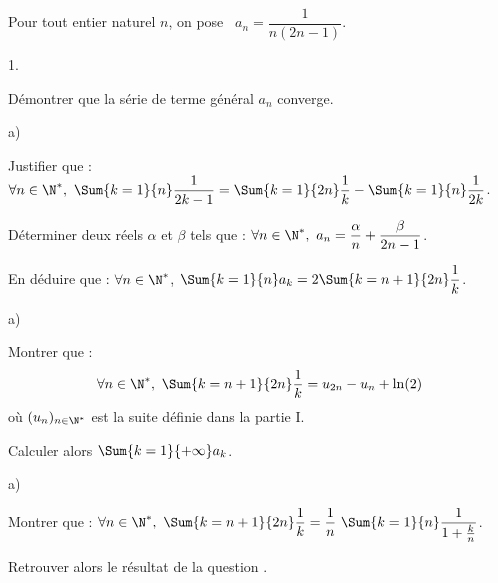 \documentclass[11pt]{article}%
\begin{document}
\noindent
Pour tout entier naturel $n$, on pose \ $a_{n} = \dfrac1{n(2n-1)}$.
\begin{noliste}{1.}
  \setlength{\itemsep}{4mm}
\item Démontrer que la série de terme général $a_{n}$ converge.

  

\item
  \begin{noliste}{a)} 
    \setlength{\itemsep}{2mm}
  \item Justifier que : $\forall n \in \N^*, \ \Sum{k = 1}{n}
    \dfrac{1}{2k-1} = \Sum{k = 1}{2n} \dfrac{1}{k} - \Sum{k = 1}{n}
    \dfrac{1}{2k}$.
    
    

  \item Déterminer deux réels $\alpha$ et $\beta$ tels que : $\forall
    n \in \N^*, \ a_{n} = \dfrac{\alpha}{n} + \dfrac{\beta}{2n-1}$.

    

  \item En déduire que : $\forall n \in \N^*$, $\Sum{k = 1}{n} a_{k} =
    2 \Sum{k = n + 1}{2n} \dfrac{1}{k}$.

    
  \end{noliste}




\item 
  \begin{noliste}{a)}
    \setlength{\itemsep}{2mm}
  \item Montrer que : 
    \[
    \forall n \in \N^*, \ \Sum{k = n + 1}{2n} \dfrac{1}{k} =
    u_{2n}-u_{n} + \ln(2)
    \]
    où $(u_{n})_{n \in \N^*}$ est la suite définie dans la partie I.

    

  \item Calculer alors  $\Sum{k = 1}{+ \infty} a_{k}$.
    
    
  \end{noliste}

\item 
  \begin{noliste}{a)}
    \setlength{\itemsep}{2mm}
  \item Montrer que : $\forall n \in \N^*, \ \Sum{k = n + 1}{2n}
    \dfrac{1}{k} = \dfrac{1}{n} \ \Sum{k = 1}{n} \dfrac{1}{1 +
      \frac{k}{n}}$.

    




  \item Retrouver alors le résultat de la question .

    

  \end{noliste}
\end{noliste}
\end{document}
